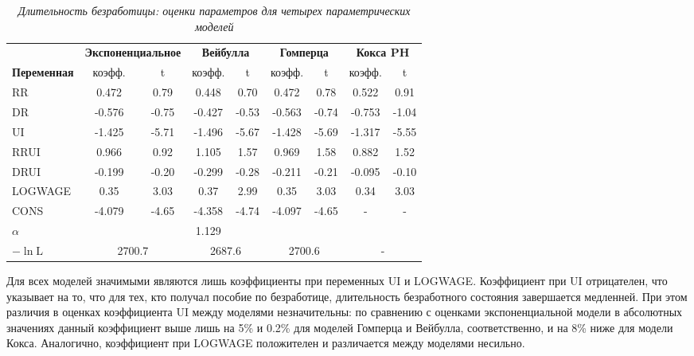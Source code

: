     \begin{table}[!htbp]\caption{\textit{Длительность безработицы: оценки параметров для четырех параметрических моделей}}\label{tab:17.8}
    \begin{center}
\begin{tabular}{lcccccccc}
\hline \hline
&\multicolumn{2}{c}{\textbf{Экспоненциальное}}&\multicolumn{2}{c}{\textbf{Вейбулла}}&\multicolumn{2}{c}{\textbf{Гомперца}}&\multicolumn{2}{c}{\textbf{Кокса PH}}\\
\cmidrule(r){2-3}\cmidrule(r){4-5}\cmidrule(r){6-7}\cmidrule(r){8-9}
\textbf{Переменная} &коэфф. &t      &коэфф. &t      &коэфф. &t      &коэфф. &t\\
\hline
RR                  &0.472  &0.79   &0.448  &0.70   &0.472  &0.78   &0.522  &0.91\\
DR                  &-0.576 &-0.75  &-0.427 &-0.53  &-0.563 &-0.74  &-0.753 &-1.04\\
UI                  &-1.425 &-5.71  &-1.496 &-5.67  &-1.428 &-5.69  &-1.317 &-5.55\\
RRUI                &0.966  &0.92   &1.105  &1.57   &0.969  &1.58   &0.882  &1.52\\
DRUI                &-0.199 &-0.20  &-0.299 &-0.28  &-0.211 &-0.21  &-0.095 &-0.10\\
LOGWAGE             &0.35   &3.03   &0.37   &2.99   &0.35   &3.03   &0.34   &3.03\\
CONS                &-4.079 &-4.65  &-4.358 &-4.74  &-4.097 &-4.65  &-      &-\\
$\alpha$            &       &       &1.129  &&&&&\\
$-\ln\textrm{L}$    &\multicolumn{2}{c}{2700.7}&\multicolumn{2}{c}{2687.6}&\multicolumn{2}{c}{2700.6}&\multicolumn{2}{c}{-}\\
\hline \hline
\end{tabular}
    \end{center}
    \end{table}

Для всех моделей значимыми являются лишь коэффициенты при переменных UI и LOGWAGE. Коэффициент при UI отрицателен, что указывает на то, что для тех, кто получал пособие по безработице, длительность безработного состояния завершается медленней. При этом различия в оценках коэффициента UI между моделями незначительны: по сравнению с оценками экспоненциальной модели в абсолютных значениях данный коэффициент выше лишь на 5\% и 0.2\% для моделей Гомперца и Вейбулла, соответственно, и на 8\% ниже для модели Кокса. Аналогично, коэффициент при LOGWAGE положителен и различается между моделями несильно.

